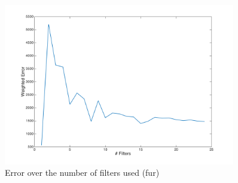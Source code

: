 \documentclass[11pt, oneside]{article}   	%
\begin{document}
\begin{figure}[H]
	\centering
	\includegraphics[width=0.9\textwidth]{fur}
	\caption{Error over the number of filters used (fur)}
	\label {fig:fur}
\end{figure}
\end{document}
